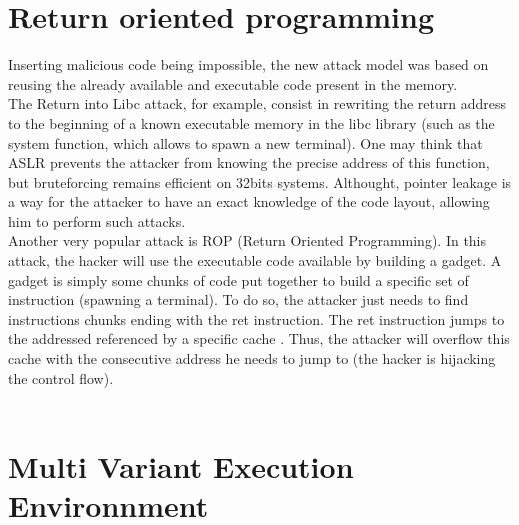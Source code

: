 \documentclass[english]{enstaPRE}
\begin{document}
\section{Return oriented programming}\label{ROP}
Inserting malicious code being impossible, the new attack model was based on reusing the already available and executable code present
in the memory. \\ The Return into Libc attack, for example, consist in rewriting the return address to the beginning of a known
executable memory in the libc library (such as the system function, which allows to spawn a new terminal). One may think that ASLR
prevents the attacker from knowing the precise address of this function, but bruteforcing remains efficient on 32bits systems.
Althought, pointer leakage is a way for the attacker to have an exact knowledge of the code layout, allowing him to perform such attacks.
\\
Another very popular attack is ROP (Return Oriented Programming). In this attack, the hacker will use the executable code available 
by building a gadget. A gadget is simply some chunks of code put together to build a specific set of instruction (spawning a terminal).
To do so, the attacker just needs to find instructions chunks ending with the ret instruction. The ret instruction jumps to the addressed
referenced by a specific cache \cite{warInMemory}. Thus, the attacker will overflow this cache with the consecutive address he needs to jump to 
(the hacker is hijacking the control flow).
\\ \\

\section{Multi Variant Execution Environnment}
\end{document}
